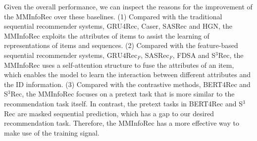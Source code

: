 \documentclass[conference]{IEEEtran}
\begin{document}
Given the overall performance, we can inspect the reasons for the improvement of the MMInfoRec over these baselines. (1) Compared with the traditional sequential recommender systems, GRU4Rec, Caser, SASRec and HGN, the MMInfoRec exploits the attributes of items to assist the learning of representations of items and sequences. (2) Compared with the feature-based sequential recommender systems, $\text{GRU4Rec}_F$, $\text{SASRec}_F$, FDSA and S$^3$Rec, the MMInfoRec uses a self-attention structure to fuse the attributes of an item, which enables the model to learn the interaction between different attributes and the ID information. (3) Compared with the contrastive methods, BERT4Rec and S$^3$Rec, the MMInfoRec focuses on a pretext task that is more similar to the recommendation task itself. In contrast, the pretext tasks in BERT4Rec and S$^3$Rec are masked sequential prediction, which has a gap to our desired recommendation task. Therefore, the MMInfoRec has a more effective way to make use of the training signal.
\end{document}
